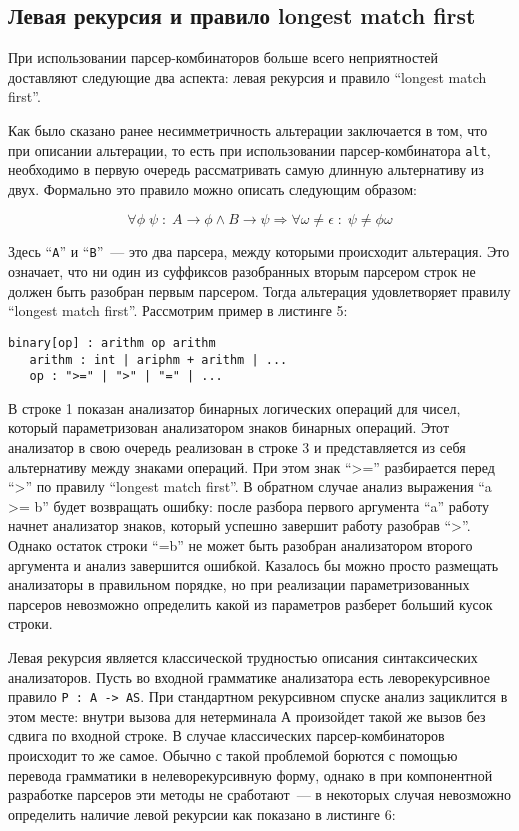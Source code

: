 \subsection{Левая рекурсия и правило longest match first}

При использовании парсер-комбинаторов больше всего неприятностей доставляют следующие два аспекта: левая рекурсия и правило ``longest match first''.

Как было сказано ранее несимметричность альтерации заключается в том, что при описании альтерации, то есть при использовании парсер-комбинатора \lstinline|alt|, необходимо в первую очередь рассматривать самую длинную альтернативу из двух. Формально это правило можно описать следующим образом:

\[
\forall\phi\;\psi\;:\; A\rightarrow\phi \wedge B\rightarrow\psi \Rightarrow \forall\omega\ne\epsilon\;:\;\psi\ne\phi\omega
\]

Здесь ``\lstinline|A|'' и ``\lstinline|B|''~--- это два парсера, между которыми происходит альтерация.
Это означает, что ни один из суффиксов разобранных вторым парсером строк не должен быть разобран первым парсером. Тогда альтерация удовлетворяет правилу ``longest match first''.
Рассмотрим пример в листинге 5:
\clearpage

\begin{lstlisting}[basicstyle=\small, caption=``Longest match first'']
   binary[op] : arithm op arithm
   arithm : int | ariphm + arithm | ...
   op : ">=" | ">" | "=" | ...
\end{lstlisting}

В строке 1 показан анализатор бинарных логических операций для чисел, который параметризован анализатором знаков бинарных операций. Этот анализатор в свою очередь реализован в строке 3 и представляется из себя альтернативу между знаками операций. При этом знак ``>='' разбирается перед ``>'' по правилу ``longest match first''. В обратном случае анализ выражения ``a >= b'' будет возвращать ошибку: после разбора первого аргумента ``a'' работу начнет анализатор знаков, который успешно завершит работу разобрав ``>''. Однако остаток строки ``=b'' не может быть разобран анализатором второго аргумента и анализ завершится ошибкой. Казалось бы можно просто размещать анализаторы в правильном порядке, но при реализации параметризованных парсеров невозможно определить какой из параметров разберет больший кусок строки.

Левая рекурсия является классической трудностью описания синтаксических анализаторов. Пусть во входной грамматике анализатора есть леворекурсивное правило \lstinline|P : A -> AS|. При стандартном рекурсивном спуске анализ зациклится в этом месте: внутри вызова для нетерминала А произойдет такой же вызов без сдвига по входной строке. В случае классических парсер-комбинаторов происходит то же самое. Обычно с такой проблемой борются с помощью перевода грамматики в нелеворекурсивную форму, однако в при компонентной разработке парсеров эти методы не сработают~--- в некоторых случая невозможно определить наличие левой рекурсии как показано в листинге 6:
\clearpage

